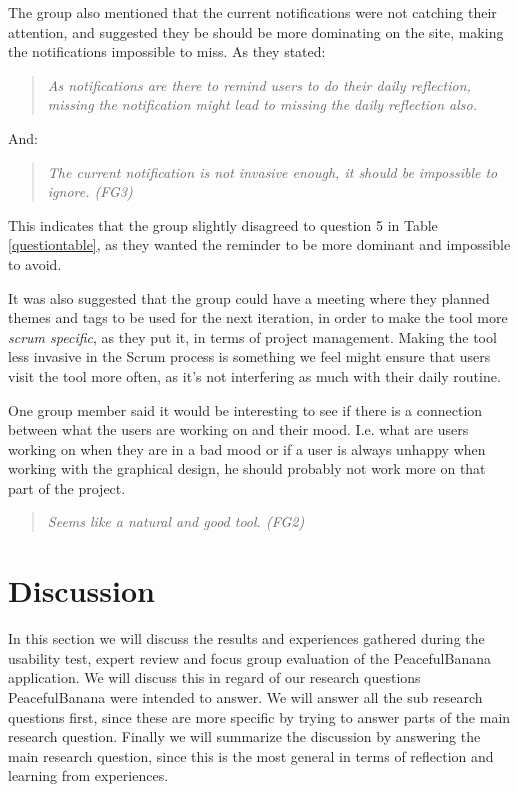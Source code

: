 The group also mentioned that the current notifications were not catching their attention, and suggested they be should be more dominating on the site, making the notifications impossible to miss. As they stated: 
\begin{quote}
\emph{As notifications are there to remind users to do their daily reflection, missing the notification might lead to missing the daily reflection also.}
\end{quote}
And:
\begin{quote}
\emph{The current notification is not invasive enough, it should be impossible to ignore. (FG3)}
\end{quote}
This indicates that the group slightly disagreed to question 5 in Table \ref{questiontable}, as they wanted the reminder to be more dominant and impossible to avoid.

It was also suggested that the group could have a meeting where they planned themes and tags to be used for the next iteration, in order to make the tool more \emph{scrum specific}, as they put it, in terms of project management. Making the tool less invasive in the Scrum process is something we feel might ensure that users visit the tool more often, as it's not interfering as much with their daily routine. 

One group member said it would be interesting to see if there is a connection between what the users are working on and their mood. I.e. what are users working on when they are in a bad mood or if a user is always unhappy when working with the graphical design, he should probably not work more on that part of the project.
\begin{quote}
\emph{Seems like a natural and good tool. (FG2)}
\end{quote}

\section{Discussion}
In this section we will discuss the results and experiences gathered during the usability test, expert review and focus group evaluation of the PeacefulBanana application. We will discuss this in regard of our research questions PeacefulBanana were intended to answer. We will answer all the sub research questions first, since these are more specific by trying to answer parts of the main research question. Finally we will summarize the discussion by answering the main research question, since this is the most general in terms of reflection and learning from experiences. 

